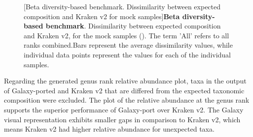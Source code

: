 \begin{figure}[H]
  \centering
  \hfill
  [Beta diversity-based benchmark. Dissimilarity between expected composition and Kraken v2 for mock samples]{\textbf{Beta diversity-based benchmark}. Dissimilarity between expected composition and Kraken v2, for the mock samples (). The term 'All' refers to all ranks combined.Bars represent the average dissimilarity values, while individual data points represent the values for each of the individual samples.} \label{fig:mock_soil_beta_div_kraken2}%
\end{figure}

Regarding the generated genus rank relative abundance plot, taxa in the output of Galaxy-ported and Kraken v2 that are differed from the expected taxonomic composition were excluded. The plot of the relative abundance at the genus rank supports the superior performance of Galaxy-port over Kraken v2. The Galaxy visual representation exhibits smaller gaps in comparison to Kraken v2, which means Kraken v2 had higher relative abundance for unexpected taxa. 


